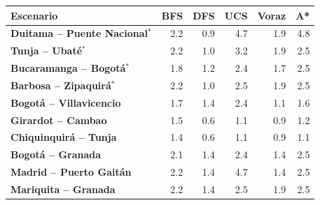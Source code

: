 \renewcommand{\arraystretch}{1.2}
\begin{tabular}{|l|r|r|r|r|r|}
\hline
\rowcolor{gray!20} \textbf{Escenario} & \textbf{BFS} & \textbf{DFS} & \textbf{UCS} & \textbf{Voraz} & \textbf{A*} \\
\hline
\textbf{Duitama -- Puente Nacional$^{*}$} & 2.2 & 0.9 & 4.7 & 1.9 & 4.8 \\
\hline
\textbf{Tunja -- Ubaté$^{*}$} & 2.2 & 1.0 & 3.2 & 1.9 & 2.5 \\
\hline
\textbf{Bucaramanga -- Bogotá$^{*}$} & 1.8 & 1.2 & 2.4 & 1.7 & 2.5 \\
\hline
\textbf{Barbosa -- Zipaquirá$^{*}$} & 2.2 & 1.0 & 2.5 & 1.9 & 2.5 \\
\hline
\textbf{Bogotá -- Villavicencio} & 1.7 & 1.4 & 2.4 & 1.1 & 1.6 \\
\hline
\textbf{Girardot -- Cambao} & 1.5 & 0.6 & 1.1 & 0.9 & 1.2 \\
\hline
\textbf{Chiquinquirá -- Tunja} & 1.4 & 0.6 & 1.1 & 0.9 & 1.1 \\
\hline
\textbf{Bogotá -- Granada} & 2.1 & 1.4 & 2.4 & 1.4 & 2.5 \\
\hline
\textbf{Madrid -- Puerto Gaitán} & 2.2 & 1.4 & 4.7 & 1.4 & 2.5 \\
\hline
\textbf{Mariquita -- Granada} & 2.2 & 1.4 & 2.5 & 1.9 & 2.5 \\
\hline
\end{tabular}
